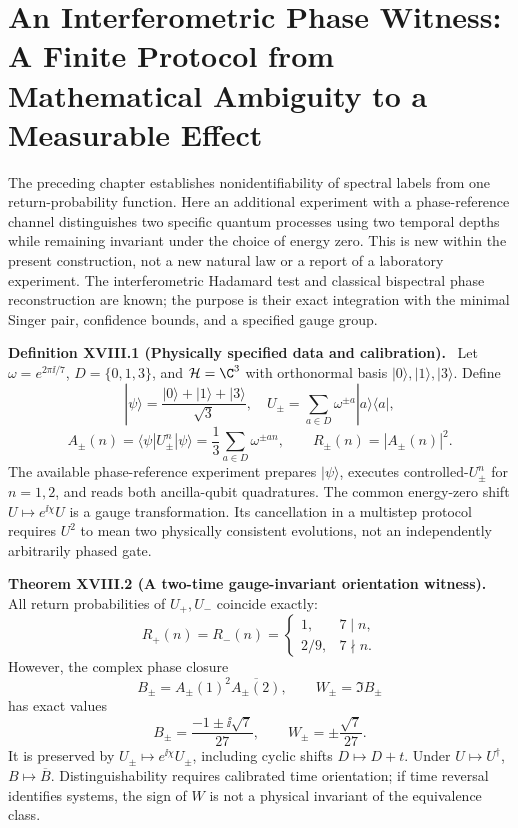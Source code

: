 \documentclass[11pt,a4paper,oneside]{book}
\newcommand{\statement}[3]{\par\medskip\noindent\textbf{#1 #2 (#3).}\ }
\begin{document}
\chapter{An Interferometric Phase Witness: A Finite Protocol from Mathematical Ambiguity to a Measurable Effect}
The preceding chapter establishes nonidentifiability of spectral labels from one return-probability function. Here an additional experiment with a phase-reference channel distinguishes two specific quantum processes using two temporal depths while remaining invariant under the choice of energy zero. This is new within the present construction, not a new natural law or a report of a laboratory experiment. The interferometric Hadamard test and classical bispectral phase reconstruction are known; the purpose is their exact integration with the minimal Singer pair, confidence bounds, and a specified gauge group.
\statement{Definition}{XVIII.1}{Physically specified data and calibration} Let $\omega=e^{2\pi\ii/7}$, $D=\{0,1,3\}$, and $\mathcal H=\C^3$ with orthonormal basis $|0\rangle,|1\rangle,|3\rangle$. Define
\[|\psi\rangle=\frac{|0\rangle+|1\rangle+|3\rangle}{\sqrt3},\quad U_\pm=\sum_{a\in D}\omega^{\pm a}|a\rangle\langle a|,\]
\[A_\pm(n)=\langle\psi|U_\pm^n|\psi\rangle=\frac13\sum_{a\in D}\omega^{\pm an},\qquad R_\pm(n)=|A_\pm(n)|^2.\]
The available phase-reference experiment prepares $|\psi\rangle$, executes controlled-$U_\pm^n$ for $n=1,2$, and reads both ancilla-qubit quadratures. The common energy-zero shift $U\mapsto e^{\ii\chi}U$ is a gauge transformation. Its cancellation in a multistep protocol requires $U^2$ to mean two physically consistent evolutions, not an independently arbitrarily phased gate.
\statement{Theorem}{XVIII.2}{A two-time gauge-invariant orientation witness} All return probabilities of $U_+,U_-$ coincide exactly:
\begin{equation}R_+(n)=R_-(n)=\begin{cases}1,&7\mid n,\\2/9,&7\nmid n.\end{cases}\tag{88}\end{equation}
However, the complex phase closure
\begin{equation}B_\pm=A_\pm(1)^2\overline{A_\pm(2)},\qquad W_\pm=\Im B_\pm\tag{89}\end{equation}
has exact values
\begin{equation}B_\pm=\frac{-1\pm\ii\sqrt7}{27},\qquad W_\pm=\pm\frac{\sqrt7}{27}.\tag{90}\end{equation}
It is preserved by $U_\pm\mapsto e^{\ii\chi}U_\pm$, including cyclic shifts $D\mapsto D+t$. Under $U\mapsto U^\dagger$, $B\mapsto\overline B$. Distinguishability requires calibrated time orientation; if time reversal identifies systems, the sign of $W$ is not a physical invariant of the equivalence class.
\end{document}
